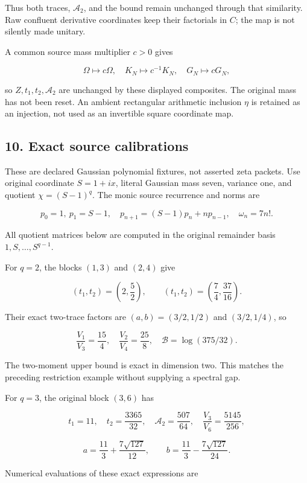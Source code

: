 \documentclass[
  11pt,
]{article}
\begin{document}
Thus both traces, \(\mathcal A_2\), and the bound remain unchanged
through that similarity. Raw confluent derivative coordinates keep their
factorials in \(C\); the map is not silently made unitary.

A common source mass multiplier \(c>0\) gives

\[
 \Omega\mapsto c\Omega,\quad K_N\mapsto c^{-1}K_N,\quad
 G_N\mapsto cG_N,
\]

so \(Z,t_1,t_2,\mathcal A_2\) are unchanged by these displayed
composites. The original mass has not been reset. An ambient rectangular
arithmetic inclusion \(\eta\) is retained as an injection, not used as
an invertible square coordinate map.

\subsection{10. Exact source
calibrations}\label{exact-source-calibrations}

These are declared Gaussian polynomial fixtures, not asserted zeta
packets. Use original coordinate \(S=1+ix\), literal Gaussian mass
seven, variance one, and quotient \(\chi=(S-1)^q\). The monic source
recurrence and norms are

\[
 p_0=1,\ p_1=S-1,\quad p_{n+1}=(S-1)p_n+np_{n-1},\quad
 \omega_n=7n!.
\]

All quotient matrices below are computed in the original remainder basis
\(1,S,\ldots,S^{q-1}\).

For \(q=2\), the blocks \((1,3)\) and \((2,4)\) give

\[
 (t_1,t_2)=\left(2,\frac52\right),\qquad
 (t_1,t_2)=\left(\frac74,\frac{37}{16}\right).
\]

Their exact two-trace factors are \((a,b)=(3/2,1/2)\) and \((3/2,1/4)\),
so

\[
 \frac{V_1}{V_3}=\frac{15}{4},\quad
 \frac{V_2}{V_4}=\frac{25}{8},\quad
 \mathcal B=\log(375/32).
\]

The two-moment upper bound is exact in dimension two. This matches the
preceding restriction example without supplying a spectral gap.

For \(q=3\), the original block \((3,6)\) has

\[
 t_1=11,\quad t_2=\frac{3365}{32},\quad
 \mathcal A_2=\frac{507}{64},\quad \frac{V_3}{V_6}=\frac{5145}{256},
\]

\[
 a=\frac{11}{3}+\frac{7\sqrt{127}}{12},\qquad
 b=\frac{11}{3}-\frac{7\sqrt{127}}{24}.
\]

Numerical evaluations of these exact expressions are
\end{document}
